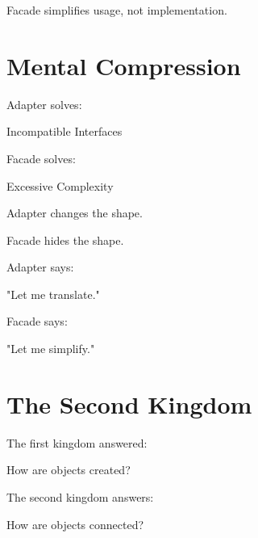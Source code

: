 \documentclass[11pt,a4paper]{book}
\begin{document}

\begin{rosettarule}

Facade simplifies usage,
not implementation.

\end{rosettarule}

\section{Mental Compression}

\begin{compressionbox}

Adapter solves:

\begin{center}
Incompatible Interfaces
\end{center}

Facade solves:

\begin{center}
Excessive Complexity
\end{center}

Adapter changes the shape.

Facade hides the shape.

\end{compressionbox}

\begin{rosettarule}

Adapter says:

"Let me translate."

\end{rosettarule}

\begin{rosettarule}

Facade says:

"Let me simplify."

\end{rosettarule}

\section{The Second Kingdom}

\begin{idea}

The first kingdom answered:

\begin{center}
How are objects created?
\end{center}

The second kingdom answers:

\begin{center}
How are objects connected?
\end{center}

\end{idea}
\end{document}
